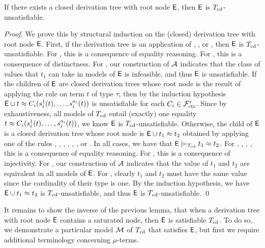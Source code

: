 \begin{lemma}%
\label{lem:rs}%
\afterDot
If there exists a closed derivation tree with root node $\mathsf{E}$, then $\mathsf{E}$ is $T_{\mathrm{cd}}$-unsatisfiable.
\end{lemma}
\begin{proof}
We prove this by structural induction on the (closed) derivation tree with root node $\mathsf{E}$.
First, if the derivation tree is an application of , , or ,
then $\mathsf{E}$ is $T_{\mathrm{cd}}$-unsatisfiable.
For , this is a consequence of equality reasoning.
For , this is a consequence of distinctness.
For , our construction of $\mathcal{A}$ indicates that the class of values that $t_1$ can take in models of $\mathsf{E}$ is infeasible,
and thus $\mathsf{E}$ is unsatisfiable.
If the children of $\mathsf{E}$ are closed derivation trees
whose root node is the result of applying the rule  on term $t$ of type $\tau$,
then by the induction hypothesis $\mathsf{E} \cup t \approx C_i( s^1_i( t ), \ldots, s^{a_i}_i( t ) )$ is unsatisfiable
for each $C_i \in \mathcal{F}_{\mathrm{ctr}}^\tau$.
Since by exhaustiveness, all models of $T_{\mathrm{cd}}$ entail (exactly) one equality $t \approx C_i( s^1_i( t ), \ldots, s^{a_i}_i( t ) )$,
we know $\mathsf{E}$ is $T_{\mathrm{cd}}$-unsatisfiable.
Otherwise, the child of $\mathsf{E}$ is a closed derivation tree
whose root node is $\mathsf{E} \cup t_1 \approx t_2$ obtained by applying one of the rules , , , , , , or .
In all cases, we have that $\mathsf{E} \models_{T_{\mathrm{cd}}} t_1 \approx t_2$.
For , , , , this is a consequence of equality reasoning.
For , this is a consequence of injectivity.
For , our construction of $\mathcal{A}$ indicates that the value of $t_1$ and $t_2$ are equivalent in all models of $\mathsf{E}$.
For , clearly $t_1$ and $t_2$ must have the same value since the cardinality of their type is one.
By the induction hypothesis, we have $\mathsf{E} \cup t_1 \approx t_2$ is $T_{\mathrm{cd}}$-unsatisfiable,
and thus $\mathsf{E}$ is $T_{\mathrm{cd}}$-unsatisfiable.
\qed
\end{proof}

It remains to show the inverse of the previous lemma, that when a derivation tree with root node $\mathsf{E}$ contains a saturated node,
then $\mathsf{E}$ is satisfiable $T_{\mathrm{cd}}$.
To do so, we demonstrate a particular model $\mathcal{M}$ of $T_{\mathrm{cd}}$ that satisfies $\mathsf{E}$,
but first we require additional terminology concerning $\mu$-terms.

